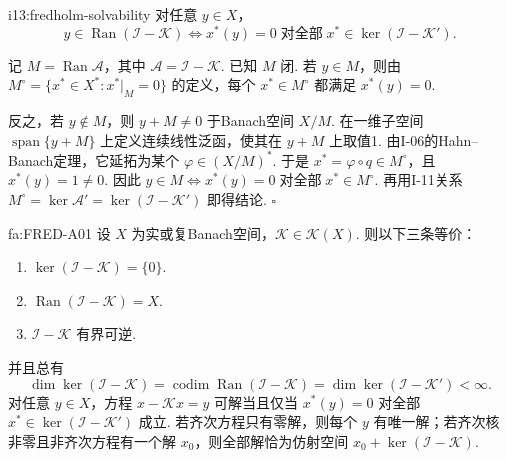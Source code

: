 \begin{FAProposition}[A][Fredholm可解性条件]{i13:fredholm-solvability}
对任意 \(\displaystyle y\in X\)，
\[
y\in\operatorname{Ran}(\mathcal I-\mathcal K)
\iff
x^*(y)=0
\;\text{对全部}\;
x^*\in\ker(\mathcal I-\mathcal K').
\]
\end{FAProposition}

\begin{FAProof}
记 \(\displaystyle M=\operatorname{Ran}\mathcal A\)，其中 \(\displaystyle \mathcal A=\mathcal I-\mathcal K\). 已知 \(\displaystyle M\) 闭. 若 \(\displaystyle y\in M\)，则由 \(\displaystyle M^\circ=\{x^*\in X^*:x^*|_M=0\}\) 的定义，每个 \(\displaystyle x^*\in M^\circ\) 都满足 \(\displaystyle x^*(y)=0\).

反之，若 \(\displaystyle y\notin M\)，则 \(\displaystyle y+M\neq0\) 于Banach空间 \(\displaystyle X/M\). 在一维子空间 \(\displaystyle \operatorname{span}\{y+M\}\) 上定义连续线性泛函，使其在 \(\displaystyle y+M\) 上取值1. 由I-06的Hahn--Banach定理，它延拓为某个 \(\displaystyle \varphi\in(X/M)^*\). 于是 \(\displaystyle x^*=\varphi\circ q\in M^\circ\)，且 \(\displaystyle x^*(y)=1\neq0\). 因此
\(\displaystyle y\in M \iff x^*(y)=0 \;\text{对全部}\; x^*\in M^\circ\).
再用I-11关系 \(\displaystyle M^\circ=\ker\mathcal A'=\ker(\mathcal I-\mathcal K')\) 即得结论.
\hfill\(\square\)
\end{FAProof}

\begin{FATheorem}{fa:FRED-A01}
设 \(\displaystyle X\) 为实或复Banach空间，\(\displaystyle \mathcal K\in\mathcal K(X)\). 则以下三条等价：
\begin{enumerate}[label=\textup{(\roman*)}]
\item \(\displaystyle \ker(\mathcal I-\mathcal K)=\{0\}\).
\item \(\displaystyle \operatorname{Ran}(\mathcal I-\mathcal K)=X\).
\item \(\displaystyle \mathcal I-\mathcal K\) 有界可逆.
\end{enumerate}
并且总有
\[
\dim\ker(\mathcal I-\mathcal K)
=
\operatorname{codim}\operatorname{Ran}(\mathcal I-\mathcal K)
=
\dim\ker(\mathcal I-\mathcal K')
<\infty.
\]
对任意 \(\displaystyle y\in X\)，方程
\(\displaystyle x-\mathcal Kx=y\)
可解当且仅当
\(\displaystyle x^*(y)=0\)
对全部 \(\displaystyle x^*\in\ker(\mathcal I-\mathcal K')\) 成立. 若齐次方程只有零解，则每个 \(\displaystyle y\) 有唯一解；若齐次核非零且非齐次方程有一个解 \(\displaystyle x_0\)，则全部解恰为仿射空间
\(\displaystyle x_0+ \ker(\mathcal I-\mathcal K)\).
\end{FATheorem}

